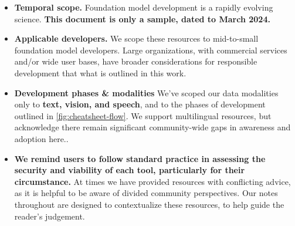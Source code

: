 \begin{itemize}[itemsep=1pt]%
    \item \textbf{Temporal scope.} Foundation model development is a rapidly evolving science. \textbf{This document is only a sample, dated to March 2024.}
    \item \textbf{Applicable developers.} We scope these resources to mid-to-small foundation model developers. Large organizations, with commercial services and/or wide user bases, have broader considerations for responsible development that what is outlined in this work.
    \item \textbf{Development phases \& modalities} We've scoped our data modalities only to \textbf{text, vision, and speech}, and to the phases of development outlined in \cref{fig:cheatsheet-flow}.
    We support multilingual resources, but acknowledge there remain significant community-wide gaps in awareness and adoption here..
    \item \textbf{We remind users to follow standard practice in assessing the security and viability of each tool, particularly for their circumstance.} At times we have provided resources with conflicting advice, as it is helpful to be aware of divided community perspectives. Our notes throughout are designed to contextualize these resources, to help guide the reader's judgement.
\end{itemize}

\clearpage

